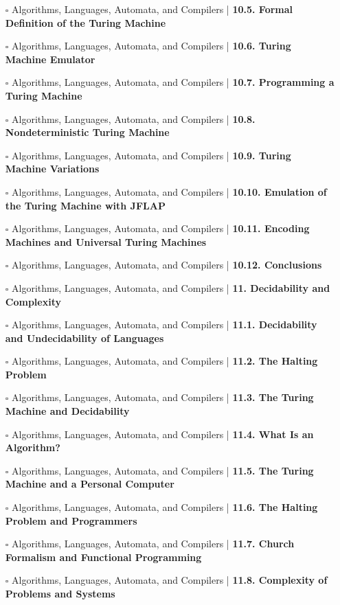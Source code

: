 \documentclass[a4, landscape, 12pt]{article}
\newcommand{\checkbox}{$\square$}%
\begin{document}
\begin{itemize}
{}
\item [\checkbox]  Algorithms, Languages, Automata, and Compilers | \textbf{ 10.5. Formal Definition of the Turing Machine
}
\item [\checkbox]  Algorithms, Languages, Automata, and Compilers | \textbf{ 10.6. Turing Machine Emulator
}
\item [\checkbox]  Algorithms, Languages, Automata, and Compilers | \textbf{ 10.7. Programming a Turing Machine
}
\item [\checkbox]  Algorithms, Languages, Automata, and Compilers | \textbf{ 10.8. Nondeterministic Turing Machine
}
\item [\checkbox]  Algorithms, Languages, Automata, and Compilers | \textbf{ 10.9. Turing Machine Variations
}
\item [\checkbox]  Algorithms, Languages, Automata, and Compilers | \textbf{ 10.10. Emulation of the Turing Machine with JFLAP
}
\item [\checkbox]  Algorithms, Languages, Automata, and Compilers | \textbf{ 10.11. Encoding Machines and Universal Turing Machines
}
\item [\checkbox]  Algorithms, Languages, Automata, and Compilers | \textbf{ 10.12. Conclusions
}
\item [\checkbox]  Algorithms, Languages, Automata, and Compilers | \textbf{ 11. Decidability and Complexity
}
\item [\checkbox]  Algorithms, Languages, Automata, and Compilers | \textbf{ 11.1. Decidability and Undecidability of Languages
}
\item [\checkbox]  Algorithms, Languages, Automata, and Compilers | \textbf{ 11.2. The Halting Problem
}
\item [\checkbox]  Algorithms, Languages, Automata, and Compilers | \textbf{ 11.3. The Turing Machine and Decidability
}
\item [\checkbox]  Algorithms, Languages, Automata, and Compilers | \textbf{ 11.4. What Is an Algorithm?
}
\item [\checkbox]  Algorithms, Languages, Automata, and Compilers | \textbf{ 11.5. The Turing Machine and a Personal Computer
}
\item [\checkbox]  Algorithms, Languages, Automata, and Compilers | \textbf{ 11.6. The Halting Problem and Programmers
}
\item [\checkbox]  Algorithms, Languages, Automata, and Compilers | \textbf{ 11.7. Church Formalism and Functional Programming
}
\item [\checkbox]  Algorithms, Languages, Automata, and Compilers | \textbf{ 11.8. Complexity of Problems and Systems
}
\end{itemize}
\end{document}
